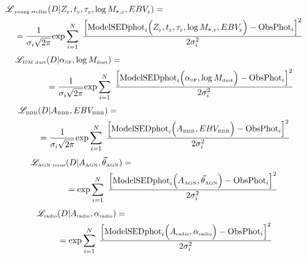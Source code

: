 \begin{equation} \begin{split}
    \mathscr{L}&_{\mbox{\tiny{young stellar}}}(D| Z_{\mbox{\tiny{y}}}, t_{\mbox{\tiny{y}}}, \tau_{\mbox{\tiny{y}}}, \log M_{\star, \mbox{\tiny{y}}}, EBV_{\mbox{\tiny{y}}})   = \\ & =  \dfrac{1}{\sigma_i\sqrt{2\pi} }\mbox{exp} \sum_{i=1}^{N}\; \dfrac{ \Big[ \mbox{ModelSEDphot}_i\Big( Z_{\mbox{\tiny{y}}}, t_{\mbox{\tiny{y}}}, \tau_{\mbox{\tiny{y}}}, \log M_{\star, \mbox{\tiny{y}}}, EBV_{\mbox{\tiny{y}}}\Big)- \mbox{ObsPhot}_i   \Big]^2}{ 2 \sigma_i^2   }
  \end{split} \label{eq:LikeliYS}
\end{equation} 
\begin{equation}\begin{split}
   \mathscr{L}_{\mbox{\tiny{ISM dust}}}&(D|\alpha_{\mbox{\tiny{SF}}}, \log M_{\mbox{\tiny{dust}}}) = \\ & = \dfrac{1}{\sigma_i\sqrt{2\pi} } \mbox{exp} \sum_{i=1}^{N}\; \dfrac{ \Big[ \mbox{ModelSEDphot}_i\Big( \alpha_{\mbox{\tiny{SF}}}, \log M_{\mbox{\tiny{dust}}}\Big)- \mbox{ObsPhot}_i   \Big]^2}{ 2 \sigma_i^2   }  \end{split}  \label{eq:LikeliDust}
\end{equation}
\begin{equation} \begin{split}
   \mathscr{L}_{\mbox{\tiny{BBB}}}&(D|A_{\mbox{\tiny{BBB}}}, EBV_{\mbox{\tiny{BBB}}}) = \\ & = \dfrac{1}{\sigma_i\sqrt{2\pi} }\mbox{exp} \sum_{i=1}^{N}\; \dfrac{ \Big[ \mbox{ModelSEDphot}_i\Big( A_{\mbox{\tiny{BBB}}}, EBV_{\mbox{\tiny{BBB}}}\Big)- \mbox{ObsPhot}_i   \Big]^2}{ 2 \sigma_i^2   } \end{split}  \label{eq:LikeliBBB}
 \end{equation}
\begin{equation}\begin{split} 
 \mathscr{L}_{\mbox{\tiny{AGN torus}}}&(D|A_{\mbox{\tiny{AGN}}}, \vec{\theta}_{\mbox{\tiny{AGN}}})=\\ & =  \mbox{exp} \sum_{i=1}^{N}\; \dfrac{ \Big[ \mbox{ModelSEDphot}_i\Big( A_{\mbox{\tiny{AGN}}}, \vec{\theta}_{\mbox{\tiny{AGN}}}\Big)- \mbox{ObsPhot}_i   \Big]^2}{ 2 \sigma_i^2   }  \end{split}   \label{eq:LikeliTor}
 \end{equation}
\begin{equation} \begin{split}
\mathscr{L}_{\mbox{\tiny{radio}}}&(D|A_{\mbox{\tiny{radio}}}, \alpha_{\mbox{\tiny{radio}}}) =\\ & =  \mbox{exp} \sum_{i=1}^{N}\; \dfrac{ \Big[ \mbox{ModelSEDphot}_i\Big( A_{\mbox{\tiny{radio}}}, \alpha_{\mbox{\tiny{radio}}} \Big)- \mbox{ObsPhot}_i   \Big]^2}{ 2 \sigma_i^2   } \end{split}    \label{eq:LikeliRad}
 \end{equation}
